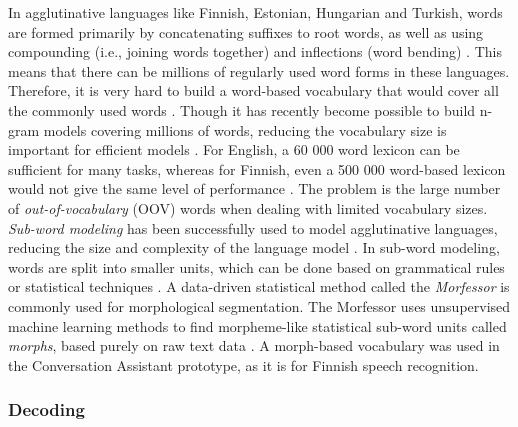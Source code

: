 \documentclass[english, 12pt, a4paper, pdftex, elec, utf8]{aaltothesis}
\begin{document}
In agglutinative languages like Finnish, Estonian, Hungarian and Turkish, words are formed primarily by concatenating suffixes to root words, as well as using compounding (i.e., joining words together) and inflections (word bending) \cite{arisoy2008statistical, kurimo2006unlimited, hirsimaki2006unlimited}. This means that there can be millions of regularly used word forms in these languages. Therefore, it is very hard to build a word-based vocabulary that would cover all the commonly used words \cite{arisoy2008statistical}. Though it has recently become possible to build n-gram models covering millions of words, reducing the vocabulary size is important for efficient models \cite{smit17boundaries}. For English, a 60 000 word lexicon can be sufficient for many tasks, whereas for Finnish, even a 500 000 word-based lexicon would not give the same level of performance \cite{arisoy2008statistical}. The problem is the large number of \textit{out-of-vocabulary} (OOV) words when dealing with limited vocabulary sizes. \textit{Sub-word modeling} has been successfully used to model agglutinative languages, reducing the size and complexity of the language model \cite{enarvi2017automatic, hirsimaki2006unlimited, hirsimaki2009importance, smit17boundaries}. In sub-word modeling, words are split into smaller units, which can be done based on grammatical rules or statistical techniques \cite{arisoy2008statistical}. A data-driven statistical method called the \textit{Morfessor} is commonly used for morphological segmentation. The Morfessor uses unsupervised machine learning methods to find morpheme-like statistical sub-word units called \textit{morphs}, based purely on raw text data \cite{arisoy2008statistical, kurimo2006unlimited}. A morph-based vocabulary was used in the Conversation Assistant prototype, as it is for Finnish speech recognition.

\subsubsection{Decoding} \label{sec:decoding}
\end{document}
